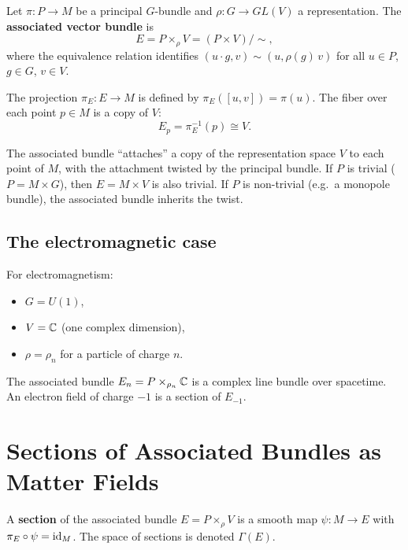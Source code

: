 \begin{definition}
Let $\pi: P \to M$ be a principal $G$-bundle and $\rho: G \to GL(V)$ a representation. The \textbf{associated vector bundle} is
\begin{equation}
E = P \times_\rho V = (P \times V) / \sim,
\end{equation}
where the equivalence relation identifies $(u \cdot g, v) \sim (u, \rho(g)\,v)$ for all $u \in P$, $g \in G$, $v \in V$.
\end{definition}

The projection $\pi_E: E \to M$ is defined by $\pi_E([u, v]) = \pi(u)$. The fiber over each point $p \in M$ is a copy of $V$:
\begin{equation}
E_p = \pi_E^{-1}(p) \cong V.
\end{equation}

\begin{remark}[Intuition]
The associated bundle ``attaches'' a copy of the representation space $V$ to each point of $M$, with the attachment twisted by the principal bundle. If $P$ is trivial ($P = M \times G$), then $E = M \times V$ is also trivial. If $P$ is non-trivial (e.g.\ a monopole bundle), the associated bundle inherits the twist.
\end{remark}

\subsection{The electromagnetic case}

For electromagnetism:
\begin{itemize}
\item $G = U(1)$,
\item $V = \mathbb{C}$ (one complex dimension),
\item $\rho = \rho_n$ for a particle of charge $n$.
\end{itemize}

The associated bundle $E_n = P \times_{\rho_n} \mathbb{C}$ is a complex line bundle over spacetime. An electron field of charge $-1$ is a section of $E_{-1}$.

\section{Sections of Associated Bundles as Matter Fields}

\begin{definition}[Section]
A \textbf{section} of the associated bundle $E = P \times_\rho V$ is a smooth map $\psi: M \to E$ with $\pi_E \circ \psi = \mathrm{id}_M$. The space of sections is denoted $\Gamma(E)$.
\end{definition}

